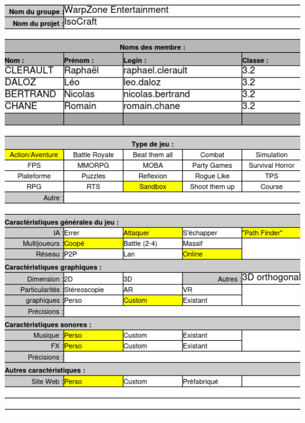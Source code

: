 \begin{center}
\includegraphics[width=1\textwidth]{figuras/Cahier-des-charges-technique1.png}
\end{center}